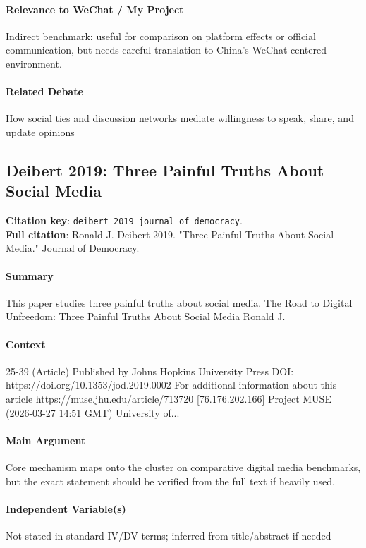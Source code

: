 \documentclass[12pt]{article}
\begin{document}
\paragraph{Relevance to WeChat / My Project} Indirect benchmark: useful for comparison on platform effects or official communication, but needs careful translation to China's WeChat-centered environment.

\paragraph{Related Debate} How social ties and discussion networks mediate willingness to speak, share, and update opinions


\subsection{Deibert 2019: Three Painful Truths About Social Media}
\textbf{Citation key}: \texttt{deibert\_2019\_journal\_of\_democracy}.\\
\textbf{Full citation}: Ronald J. Deibert 2019. "Three Painful Truths About Social Media." Journal of Democracy.

\paragraph{Summary} This paper studies three painful truths about social media. The Road to Digital Unfreedom: Three Painful Truths About Social Media Ronald J.

\paragraph{Context} 25-39 (Article) Published by Johns Hopkins University Press DOI: https://doi.org/10.1353/jod.2019.0002 For additional information about this article https://muse.jhu.edu/article/713720 [76.176.202.166] Project MUSE (2026-03-27 14:51 GMT) University of...

\paragraph{Main Argument} Core mechanism maps onto the cluster on comparative digital media benchmarks, but the exact statement should be verified from the full text if heavily used.

\paragraph{Independent Variable(s)} Not stated in standard IV/DV terms; inferred from title/abstract if needed
\end{document}
